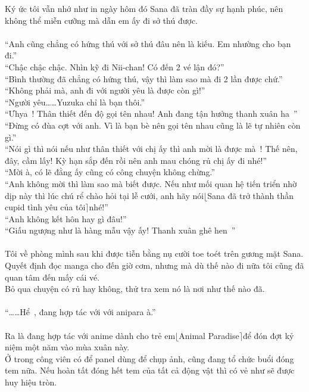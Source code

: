 \documentclass[12pt,a4paper, twosides]{book}
\begin{document}
Ký ức tôi vẫn nhớ như in ngày hôm đó Sana đã tràn đầy sự hạnh phúc, nên không thể miễn cưỡng mà dẫn em ấy đi sở thú được.\\
\\
“Anh cũng chẳng có hứng thú với sở thú đâu nên là kiếu. Em nhường cho bạn đi.”\\
“Chậc chậc chậc. Nhìn kỹ đi Nii-chan! Có đến 2 vé lận đó?”\\
“Bình thường đã chẳng có hứng thú, vậy thì làm sao mà đi 2 lần được chứ.”\\
“Không phải mà, anh đi với người yêu là được còn gì!”\\
“Người yêu……Yuzuka chỉ là bạn thôi.”\\
“Ưhya~! Thân thiết đến độ gọi tên nhau! Anh đang tận hưởng thanh xuân ha~”\\
“Đừng có đùa cợt với anh. Vì là bạn bè nên gọi tên nhau cũng là lẽ tự nhiên còn gì.”\\
“Nói gì thì nói nếu như thân thiết với chị ấy thì anh mời là được mà~! Thế nên, đây, cầm lấy! Kỳ hạn sắp đến rồi nên anh mau chóng rủ chị ấy đi nhé!”\\
“Mời à, có lẽ đằng ấy cũng có công chuyện không chừng.”\\
“Anh không mời thì làm sao mà biết được. Nếu như mối quan hệ tiến triển nhờ dịp này thì lúc chú rể chào hỏi tại lễ cưới, anh hãy nói$\lfloor$Sana đã trở thành thần cupid tình yêu của tôi$\rceil$nhé!”\\
“Anh không kết hôn hay gì đâu!”\\
“Giấu ngượng như là hàng mẫu vậy ấy! Thanh xuân ghê hen~”\\
\\
Tôi về phòng mình sau khi được tiễn bằng nụ cười toe toét trên gương mặt Sana.\\
Quyết định đọc manga cho đến giờ cơm, nhưng mà dù thế nào đi nữa tôi cũng đã quan tâm đến mấy cái vé.\\
Bỏ qua chuyện có rủ hay không, thử tra xem nó là nơi như thế nào đã.\\
\\
“……Hể~, đang hợp tác với với anipara à.”\\
\\
Ra là đang hợp tác với anime dành cho trẻ em$\lfloor$Animal Paradise$\rceil$để đón đợt kỷ niệm một năm vào mùa xuân này.\\
Ở trong công viên có để panel dùng để chụp ảnh, cũng đang tổ chức buổi đóng tem nữa. Nếu hoàn tất đóng hết tem của tất cả động vật thì có vẻ như sẽ được huy hiệu tròn.\\
\end{document}
